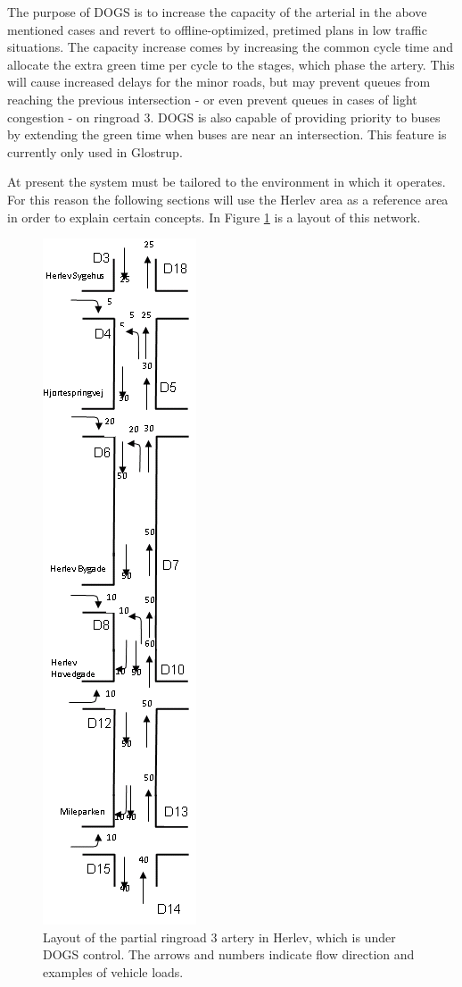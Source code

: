 The purpose of DOGS is to increase the capacity of the arterial in the above mentioned cases and revert to offline-optimized, pretimed plans in low traffic situations. The capacity increase comes by increasing the common cycle time and allocate the extra green time per cycle to the stages, which phase the artery. This will cause increased delays for the minor roads, but may prevent queues from reaching the previous intersection - or even prevent queues in cases of light congestion - on ringroad 3.
DOGS is also capable of providing priority to buses by extending the green time when buses are near an intersection. This feature is currently only used in Glostrup.

At present the system must be tailored to the environment in which it operates. For this reason the following sections will use the Herlev area as a reference area in order to explain certain concepts. In Figure \ref{fig:dogs_herlev} is a layout of this network.

\begin{figure}[htbp]
\centering
\includegraphics[scale=0.5,angle=90]{dogs_herlev.png} 
\caption{Layout of the partial ringroad 3 artery in Herlev, which is under DOGS control. The arrows and numbers indicate flow direction and examples of vehicle loads.}
\label{fig:dogs_herlev}
\end{figure}

